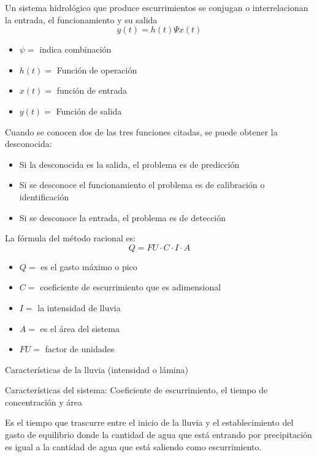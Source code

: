     Un sistema hidrológico que produce escurrimientos se conjugan o interrelacionan la entrada, el funcionamiento y su salida
    \begin{equation}
        y(t) =h(t)\Psi x(t)
    \end{equation}
    \begin{notation}
        \begin{itemize}
            \item $\psi=$ indica combinación
            \item $h(t)=$ Función de operación
            \item $x(t)=$ función de entrada
            \item $y(t)=$ Función de salida
        \end{itemize}
    \end{notation}
    Cuando se conocen dos de las tres funciones citadas, se puede obtener la desconocida:
    \begin{itemize}
        \item Si la desconocida es la salida, el problema es de predicción
        \item Si se desconoce el funcionamiento el problema es de calibración o identificación
        \item Si se desconoce la entrada, el problema es de detección
    \end{itemize}
    La fórmula del método racional es:
    \begin{equation}
        Q=FU \cdot C \cdot I \cdot A
    \end{equation}
    \begin{notation}
        \begin{itemize}
            \item $Q=$ es el gasto máximo o pico
            \item $C=$ coeficiente de escurrimiento que es adimensional
            \item $I=$ la intensidad de lluvia
            \item $A=$ es el área del sistema
            \item $FU=$ factor de unidades
        \end{itemize}
    \end{notation}
    Características de la lluvia (intensidad o lámina)
    
    Características del sistema: Coeficiente de escurrimiento, el tiempo de concentración y área
    
    Es el tiempo que trascurre entre el inicio de la lluvia y el establecimiento del gasto de equilibrio donde la cantidad de agua que está entrando por precipitación es igual a la cantidad de agua que está saliendo como escurrimiento.
    
